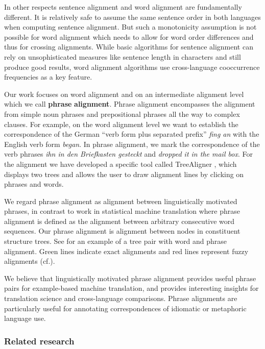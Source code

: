 \documentclass[output=paper]{LSP/langsci}
\begin{document}
In other respects sentence alignment and word alignment are fundamentally different. It is relatively safe to assume the same sentence order in both languages when computing sentence alignment. But such a monotonicity assumption is not possible for word alignment which needs to allow for word order differences and thus for crossing alignments. While basic algorithms for sentence alignment can rely on unsophisticated measures like sentence length in characters and still produce good results, word alignment algorithms use cross-language cooccurrence frequencies as a key feature. 

Our work focuses on word alignment and on an intermediate alignment level which we call \textbf{phrase} \textbf{alignment}. Phrase alignment encompasses the alignment from simple noun phrases and prepositional phrases all the way to complex clauses. For example, on the word alignment level we want to establish the correspondence of the German ``verb form plus separated prefix'' \textit{fing an} with the English verb form \textit{began}. In phrase alignment, we mark the correspondence of the verb phrases \textit{ihn in den Briefkasten gesteckt }and \textit{dropped it in the mail box}. For the alignment we have developed a specific tool called TreeAligner \citep{LundborgEtAl2007}, which displays two trees and allows the user to draw alignment lines by clicking on phrases and words. 

We regard phrase alignment as alignment between linguistically motivated phrases, in contrast to work in statistical machine translation where phrase alignment is defined as the alignment between arbitrary consecutive word sequences. Our phrase alignment is alignment between nodes in constituent structure trees. See  for an example of a tree pair with word and phrase alignment. Green lines indicate exact alignments and red lines represent fuzzy alignments (cf.). 

\largerpage
We believe that linguistically motivated phrase alignment provides useful phrase pairs for example-based machine translation, and provides interesting insights for translation science and cross-language comparisons. Phrase alignments are particularly useful for annotating correspondences of idiomatic or metaphoric language use. 

\subsubsection{Related research}\label{sec:volk:2.2.1}
\end{document}
